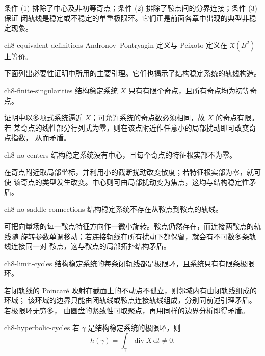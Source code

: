 条件 (1) 排除了中心及非初等奇点；条件 (2) 排除了鞍点间的分界连接；条件 (3) 保证
闭轨线是稳定或不稳定的单重极限环。它们正是前面各章中出现的典型非稳定现象。

\begin{theorem}{}{ch8-equivalent-definitions}
Andronov--Pontryagin 定义与 Peixoto 定义在 $\mathfrak X(B^2)$ 上等价。
\end{theorem}

下面列出必要性证明中所用的主要引理。它们也揭示了结构稳定系统的轨线构造。

\begin{lemma}{}{ch8-finite-singularities}
结构稳定系统 $X$ 只有有限个奇点，且所有奇点均为初等奇点。
\end{lemma}

证明中以多项式系统逼近 $X$；可允许系统的奇点数必须相同，故 $X$ 的奇点有限。若
某奇点的线性部分行列式为零，则在该点附近作任意小的局部扰动即可改变奇点指数，
从而矛盾。

\begin{lemma}{}{ch8-no-centers}
结构稳定系统没有中心，且每个奇点的特征根实部不为零。
\end{lemma}

在奇点附近取局部坐标，并利用小的截断扰动改变散度；若特征根实部为零，就可使
该奇点的类型发生改变。中心则可由局部扰动变为焦点，这均与结构稳定性矛盾。

\begin{lemma}{}{ch8-no-saddle-connections}
结构稳定系统不存在从鞍点到鞍点的轨线。
\end{lemma}

可把向量场的每一鞍点特征方向作一微小旋转。鞍点仍然存在，而连接两鞍点的轨线随
旋转参数单调移动；若连接轨线在所有扰动下都保留，就会有不可数多条轨线连接同一对
鞍点，这与鞍点的局部拓扑结构矛盾。


\begin{lemma}{}{ch8-limit-cycles}
结构稳定系统的每条闭轨线都是极限环，且系统只有有限条极限环。
\end{lemma}

若闭轨线的 Poincar\'e 映射在截面上的不动点不孤立，则邻域内有由闭轨线组成的环域；
该环域的边界只能由闭轨线或鞍点连接轨线组成，分别同前述引理矛盾。若极限环无穷多，
由圆盘的紧致性可取聚点，再用同样的边界分析即得矛盾。


\begin{lemma}{}{ch8-hyperbolic-cycles}
若 $\gamma$ 是结构稳定系统的极限环，则
\[
  h(\gamma)=\int_\gamma\operatorname{div}X\,\mathrm dt\ne0.
\]
\end{lemma}

